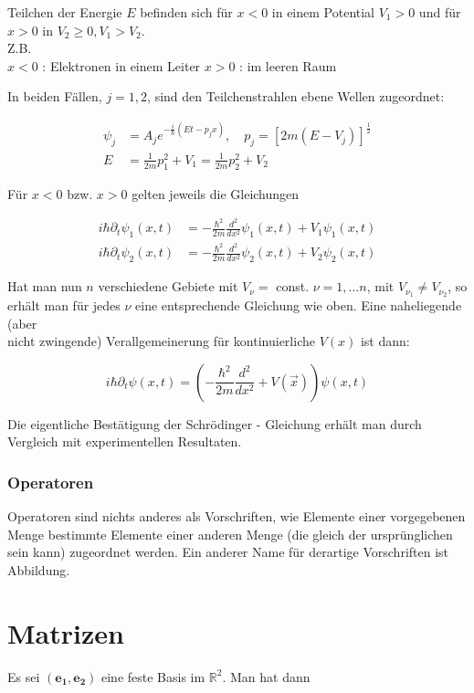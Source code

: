 \documentclass[10pt, letterpaper]{article}
\begin{document}
Teilchen der Energie $E$ befinden sich für $x<0$ in einem Potential $V_{1}>0$ und für $x>0$ in $V_{2} \geq 0, V_{1}>V_{2}$.\\
Z.B.\\
$x<0$ : Elektronen in einem Leiter $x>0$ : im leeren Raum

In beiden Fällen, $j=1,2$, sind den Teilchenstrahlen ebene Wellen zugeordnet:

$$
\begin{aligned}
\psi_{j} & =A_{j} e^{-\frac{i}{\hbar}\left(E t-p_{j} x\right)}, \quad p_{j}=\left[2 m\left(E-V_{j}\right)\right]^{\frac{1}{2}} \\
E & =\frac{1}{2 m} p_{1}^{2}+V_{1}=\frac{1}{2 m} p_{2}^{2}+V_{2}
\end{aligned}
$$

Für $x<0$ bzw. $x>0$ gelten jeweils die Gleichungen

$$
\begin{aligned}
i \hbar \partial_{t} \psi_{1}(x, t) & =-\frac{\hbar^{2}}{2 m} \frac{d^{2}}{d x^{2}} \psi_{1}(x, t)+V_{1} \psi_{1}(x, t) \\
i \hbar \partial_{t} \psi_{2}(x, t) & =-\frac{\hbar^{2}}{2 m} \frac{d^{2}}{d x^{2}} \psi_{2}(x, t)+V_{2} \psi_{2}(x, t)
\end{aligned}
$$

Hat man nun $n$ verschiedene Gebiete mit $V_{\nu}=$ const. $\nu=1, \ldots n$, mit $V_{\nu_{1}} \neq V_{\nu_{2}}$, so erhält man für jedes $\nu$ eine entsprechende Gleichung wie oben. Eine naheliegende (aber\\
nicht zwingende) Verallgemeinerung für kontinuierliche $V(x)$ ist dann:

$$
i \hbar \partial_{t} \psi(x, t)=\left(-\frac{\hbar^{2}}{2 m} \frac{d^{2}}{d x^{2}}+V(\vec{x})\right) \psi(x, t)
$$

Die eigentliche Bestätigung der Schrödinger - Gleichung erhält man durch Vergleich mit experimentellen Resultaten.

\subsubsection*{Operatoren}
Operatoren sind nichts anderes als Vorschriften, wie Elemente einer vorgegebenen Menge bestimmte Elemente einer anderen Menge (die gleich der ursprünglichen sein kann) zugeordnet werden. Ein anderer Name für derartige Vorschriften ist Abbildung.

\section*{Matrizen}
Es sei $\left(\mathbf{e}_{\mathbf{1}}, \mathbf{e}_{\mathbf{2}}\right)$ eine feste Basis im $\mathbb{R}^{2}$. Man hat dann
\end{document}
